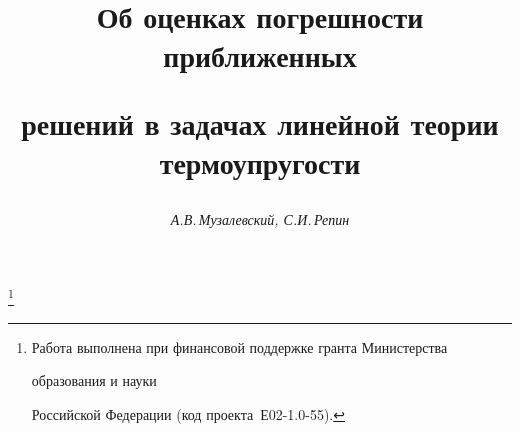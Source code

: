 









\newcommand{\SP}{\operatorname{Sp}}


\newcommand{\Div}{\operatorname{div}}


\newcommand{\tri}{| @!@!@!@!@! | @!@!@!@!@! |}


\newcommand{\norme}[1]{\tri #1 \tri}


\newcommand{\norm}[1]{\| #1 \|}


\newcommand{\abs}[1]{| #1 |}


\newcommand{\tts}[1]{}


\renewcommand{\baselinestretch}{0.96}










\setcounter{page}{64}















\author{\it А.В.\,Музалевский, С.И.\,Репин}




\title{Об оценках погрешности приближенных


решений в задачах линейной теории термоупругости}


\thanks{Работа выполнена при финансовой поддержке гранта Министерства


образования и науки


Российской Федерации (код проекта \No\,Е02-1.0-55).}





